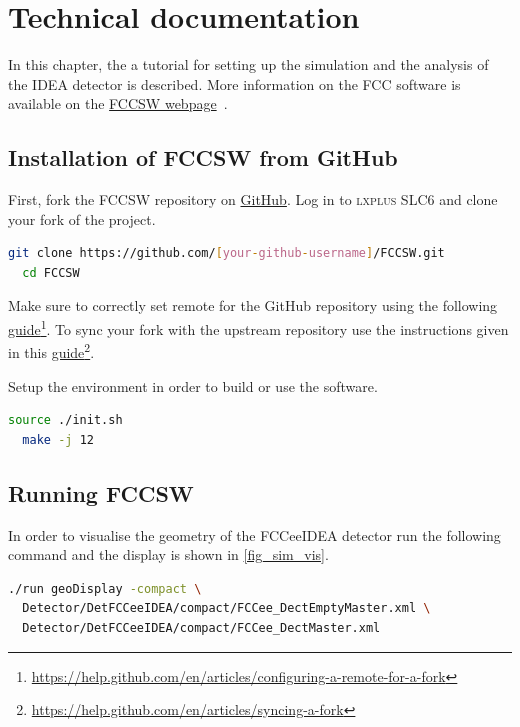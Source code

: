 \section{Technical documentation}

In this chapter, the a tutorial for setting up the simulation and the analysis of the IDEA detector is described. More information on the FCC software is available on the \href{http://fccsw.web.cern.ch/fccsw/}{FCCSW webpage}~\cite{FCCSW}.

\subsection{Installation of FCCSW from GitHub}

First, fork the FCCSW repository on \href{https://github.com/HEP-FCC/FCCSW}{GitHub}. Log in to \textsc{lxplus SLC6} and clone your fork of the project.

\begin{lstlisting}[language=bash,caption={Clone your fork of the FCCSW repository.}]
  git clone https://github.com/[your-github-username]/FCCSW.git
  cd FCCSW
\end{lstlisting}

Make sure to correctly set remote for the GitHub repository using the following \href{https://help.github.com/en/articles/configuring-a-remote-for-a-fork}{guide}\footnote{\href{https://help.github.com/en/articles/configuring-a-remote-for-a-fork}{https://help.github.com/en/articles/configuring-a-remote-for-a-fork}}. To sync your fork with the upstream repository use the instructions given in this \href{https://help.github.com/en/articles/syncing-a-fork}{guide}\footnote{\href{https://help.github.com/en/articles/syncing-a-fork}{https://help.github.com/en/articles/syncing-a-fork}}.

Setup the environment in order to build or use the software.
\begin{lstlisting}[language=bash,caption={Setup the environment and compile.}]
  source ./init.sh
  make -j 12
\end{lstlisting}

\subsection{Running FCCSW}

In order to visualise the geometry of the FCCeeIDEA detector run the following command and the display is shown in \cref{fig_sim_vis}.

\begin{lstlisting}[language=bash,caption={Visualise the full geometry of the FCCeeIDEA detector.}]
./run geoDisplay -compact \
  Detector/DetFCCeeIDEA/compact/FCCee_DectEmptyMaster.xml \
  Detector/DetFCCeeIDEA/compact/FCCee_DectMaster.xml
\end{lstlisting}

